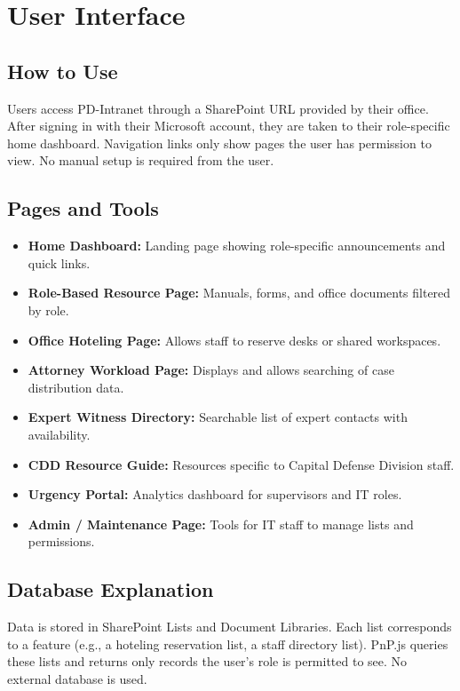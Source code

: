 \documentclass[12pt]{article}
\begin{document}
\section{User Interface}

\subsection{How to Use}
Users access PD-Intranet through a SharePoint URL provided by their office. After signing in with their Microsoft account, they are taken to their role-specific home dashboard. Navigation links only show pages the user has permission to view. No manual setup is required from the user.

\subsection{Pages and Tools}
\begin{itemize}
  \item \textbf{Home Dashboard:} Landing page showing role-specific announcements and quick links.
  \item \textbf{Role-Based Resource Page:} Manuals, forms, and office documents filtered by role.
  \item \textbf{Office Hoteling Page:} Allows staff to reserve desks or shared workspaces.
  \item \textbf{Attorney Workload Page:} Displays and allows searching of case distribution data.
  \item \textbf{Expert Witness Directory:} Searchable list of expert contacts with availability.
  \item \textbf{CDD Resource Guide:} Resources specific to Capital Defense Division staff.
  \item \textbf{Urgency Portal:} Analytics dashboard for supervisors and IT roles.
  \item \textbf{Admin / Maintenance Page:} Tools for IT staff to manage lists and permissions.
\end{itemize}

\subsection{Database Explanation}
Data is stored in SharePoint Lists and Document Libraries. Each list corresponds to a feature (e.g., a hoteling reservation list, a staff directory list). PnP.js queries these lists and returns only records the user's role is permitted to see. No external database is used.
\end{document}
